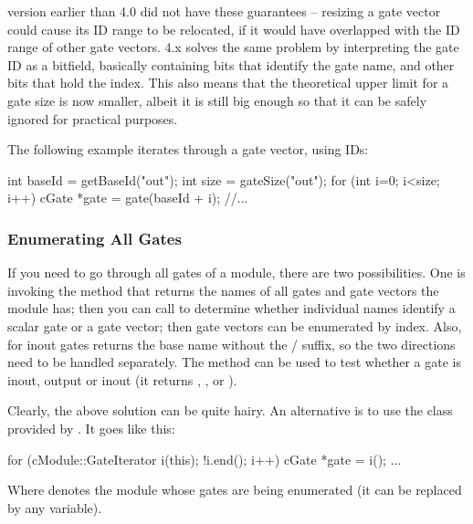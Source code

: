 \begin{note}
    {\opp} version earlier than 4.0 did not have these guarantees -- resizing
    a gate vector could cause its ID range to be relocated, if it
    would have overlapped with the ID range of other gate vectors.
    {\opp} 4.x solves the same problem by interpreting the gate ID
    as a bitfield, basically containing bits that identify the gate name,
    and other bits that hold the index. This also means that the theoretical
    upper limit for a gate size is now smaller, albeit it is still
    big enough so that it can be safely ignored for practical purposes.
\end{note}

The following example iterates through a gate vector, using IDs:

\begin{cpp}
int baseId = getBaseId("out");
int size = gateSize("out");
for (int i=0; i<size; i++) {
    cGate *gate = gate(baseId + i);
    //...
}
\end{cpp}


\subsubsection{Enumerating All Gates}

If you need to go through all gates of a module, there are
two possibilities. One is invoking the  method
that returns the names of all gates and gate vectors the module
has; then you can call  to determine
whether individual names identify a scalar gate or a gate vector;
then gate vectors can be enumerated by index. Also, for inout
gates  returns the base name without the
/ suffix, so the two directions
need to be handled separately. The  method
can be used to test whether a gate is inout, output or inout
(it returns , , or
).

Clearly, the above solution can be quite hairy. An alternative is to use
the  class provided by .
It goes like this:

\begin{cpp}
for (cModule::GateIterator i(this); !i.end(); i++) {
    cGate *gate = i();
    ...
}
\end{cpp}

Where  denotes the module whose gates are being enumerated
(it can be replaced by any  variable).


